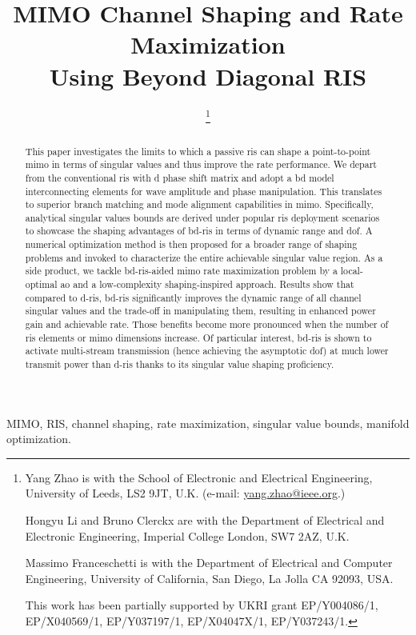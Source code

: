 \documentclass[journal]{IEEEtran}
\title{MIMO Channel Shaping and Rate Maximization\\Using Beyond Diagonal RIS}
\author{
	\IEEEauthorblockN{
		Yang Zhao, \IEEEmembership{Member, IEEE,}
		Hongyu Li, \IEEEmembership{Graduate Student Member, IEEE,}\\
		Massimo Franceschetti, \IEEEmembership{Fellow, IEEE,}
		and Bruno Clerckx, \IEEEmembership{Fellow, IEEE}
	}
	\thanks{
		Yang Zhao is with the School of Electronic and Electrical Engineering, University of Leeds, LS2 9JT, U.K. (e-mail: \href{mailto:yang.zhao@ieee.org}{yang.zhao@ieee.org}.)

		Hongyu Li and Bruno Clerckx are with the Department of Electrical and Electronic Engineering, Imperial College London, SW7 2AZ, U.K.

		Massimo Franceschetti is with the Department of Electrical and Computer Engineering, University of California, San Diego, La Jolla CA 92093, USA.

		This work has been partially supported by UKRI grant EP/Y004086/1, EP/X040569/1, EP/Y037197/1, EP/X04047X/1, EP/Y037243/1.
	}
}
\begin{document}
\maketitle

\begin{abstract}
	This paper investigates the limits to which a passive \gls{ris} can shape a point-to-point \gls{mimo} in terms of singular values
	and thus improve the rate performance.
	We depart from the conventional \gls{ris} with \gls{d} phase shift matrix and adopt a \gls{bd} model interconnecting elements for wave amplitude and phase manipulation.
	This translates to superior branch matching and mode alignment capabilities in \gls{mimo}.
	Specifically, analytical singular values bounds are derived under popular \gls{ris} deployment scenarios
	to showcase the shaping advantages of \gls{bd}-\gls{ris} in terms of dynamic range and \gls{dof}.
	A numerical optimization method is then proposed for a broader range of shaping problems and invoked to characterize the entire achievable singular value region.
	As a side product, we tackle \gls{bd}-\gls{ris}-aided \gls{mimo} rate maximization problem by a local-optimal \gls{ao} and a low-complexity shaping-inspired approach.
	Results show that compared to \gls{d}-\gls{ris}, \gls{bd}-\gls{ris} significantly improves the dynamic range of all channel singular values and the trade-off in manipulating them, resulting in enhanced power gain and achievable rate.
	Those benefits become more pronounced when the number of \gls{ris} elements or \gls{mimo} dimensions increase.
	Of particular interest, \gls{bd}-\gls{ris} is shown to activate multi-stream transmission (hence achieving the asymptotic \gls{dof}) at much lower transmit power than \gls{d}-\gls{ris} thanks to its singular value shaping proficiency.
\end{abstract}

\begin{IEEEkeywords}
	MIMO, RIS, channel shaping, rate maximization, singular value bounds, manifold optimization.
\end{IEEEkeywords}

\glsresetall
\end{document}
